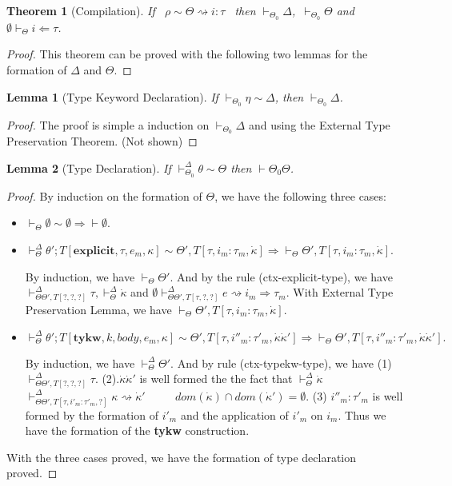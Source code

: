 \documentclass{sig-alternate}
\newcommand{\myvdash}{\vdash_{\Theta}^{\Delta}}
\newtheorem{theorem}{Theorem}
\newtheorem{lemma}{Lemma}
\begin{document}
\begin{theorem}[Compilation]
If ~$\rho\sim\Theta\rightsquigarrow i:\tau$~ then $\vdash_{\Theta_0}\Delta$,\ $\vdash_{\Theta_0}\Theta$ and $\emptyset\vdash_{\Theta} i\Leftarrow\tau$.
\end{theorem}
\begin{proof}
This theorem can be proved with the following two lemmas for the formation of $\Delta$ and $\Theta$.
\end{proof}

\begin{lemma}[Type Keyword Declaration] 
If $\vdash_{\Theta_0}\eta\sim\Delta$, then $\vdash_{\Theta_0}\Delta$.
\end{lemma}
\begin{proof}
The proof is simple a induction on $\vdash_{\Theta_0}\Delta$ and using the External Type Preservation Theorem. (Not shown)
\end{proof}

\begin{lemma}[Type Declaration]
If $\vdash_{\Theta_0}^{\Delta}\theta\sim\Theta$ then $\vdash\Theta_0\Theta$.
\end{lemma}
\begin{proof}
By induction on the formation of $\Theta$, we have the following three cases:
\begin{itemize}
\item $\vdash_{\Theta}\emptyset\sim\emptyset \Longrightarrow \vdash{\emptyset}$.
\item ${\vdash^{\Delta}_{\Theta}} \theta';T[\mathbf{explicit},\tau,e_m,\kappa] \sim \Theta',T[\tau,i_m:\tau_m,\dot\kappa] \Longrightarrow \vdash_{\Theta}\Theta',T[\tau,i_m:\tau_m,\dot{\kappa}]$. 

By induction, we have $\vdash_{\Theta}\Theta'$. And by the rule (ctx-explicit-type), we have $\vdash_{\Theta\Theta',T[?,?,?]}^{\Delta}\tau, \myvdash\dot\kappa$ and $\emptyset\vdash_{\Theta\Theta',T[\tau,?,?]}^{\Delta}e\rightsquigarrow i_m\Rightarrow\tau_m$. With External Type Preservation Lemma, we have $\vdash_{\Theta}\Theta',T[\tau,i_m:\tau_m,\dot{\kappa}]$.
\item $\myvdash \theta';T[\mathbf{tykw},k,body,e_m,\kappa] \sim \Theta',T[\tau,i''_m:\tau'_m,\dot{\kappa}\dot{\kappa}'] \Longrightarrow \vdash_{\Theta}\Theta',T[\tau,i''_m:\tau'_m,\dot{\kappa}\dot{\kappa}'].$

By induction, we have $\myvdash\Theta'$. And by rule (ctx-typekw-type), we have (1) $\vdash_{\Theta\Theta',T[?,?,?]}^{\Delta}\tau$. (2).$\dot\kappa\dot\kappa'$ is well formed the the fact that $\myvdash \dot\kappa$~~~~ $\vdash^{\Delta}_{\Theta\Theta',T[\tau,i'_m:\tau'_m,?]}\kappa\rightsquigarrow\dot{\kappa}'$ ~~~~ $dom(\dot{\kappa})\cap dom(\dot{\kappa}')=\emptyset$. (3) $i''_m:\tau'_m$ is well formed by the formation of $i'_m$ and the application of $i'_m$ on $i_m$. Thus we have the formation of the \textbf{tykw} construction.
\end{itemize}
With the three cases proved, we have the formation of type declaration proved.
\end{proof}
\end{document}
